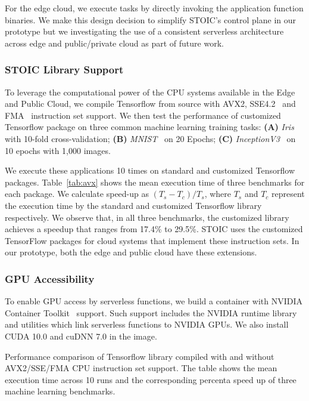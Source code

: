 For the edge cloud, we execute tasks by directly invoking
the application function binaries. We make this design decision to simplify STOIC's control plane in  our prototype but we investigating the use of
a consistent serverless architecture across edge and public/private 
cloud as part of future work.
 
 \BlankLine
 \subsubsection{STOIC Library Support}
 To leverage the computational power of the CPU systems available 
in the Edge and Public Cloud, we compile Tensorflow from source with AVX2, SSE4.2~\cite{ref:avx} and FMA~\cite{ref:fma} instruction set support. We then test the performance of customized Tensorflow package on three common machine learning training tasks: \textbf{(A)} \textit{Iris}~\cite{ref:iris} with 10-fold cross-validation; \textbf{(B)} \textit{MNIST}~\cite{ref:mnist} on 20 Epochs; \textbf{(C)} \textit{InceptionV3}~\cite{ref:v3} on 10 epochs with 1,000 images. 

We execute these applications 10 times on standard and customized Tensorflow packages. Table~\ref{tab:avx} shows the mean execution time of three benchmarks 
for each package. We calculate speed-up as $(T_s - T_c) / T_s$, where $T_s$ and $T_c$ represent the execution time by the standard and customized Tensorflow library respectively. We observe that, in all three benchmarks, the customized library achieves a speedup that ranges from 17.4\% to 29.5\%. STOIC uses
the customized TensorFlow packages for cloud systems that implement these
instruction sets.  In our prototype, both the edge and public cloud have
these extensions.
 
 \BlankLine
 \subsubsection{GPU Accessibility}
 To enable GPU access by serverless functions, we build a container with
NVIDIA Container Toolkit~\cite{ref:nvidia} support.  Such support 
includes the NVIDIA runtime library and utilities which
link serverless functions to NVIDIA GPUs. We also install CUDA 10.0 
and cuDNN 7.0 in the image.
 
\begin{table}[]
\centering

\caption{Performance comparison of Tensorflow library compiled with and without AVX2/SSE/FMA CPU instruction set support. The table shows the mean execution time across 10 runs and the corresponding percenta speed up of three machine learning benchmarks.  \label{tab:avx}}
\end{table}
 
